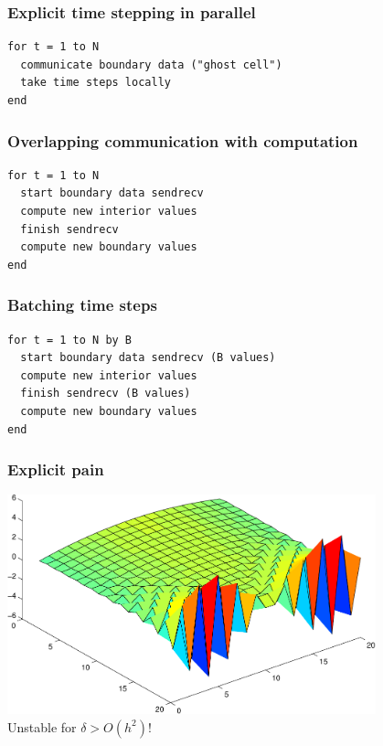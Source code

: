 \documentclass{beamer}
\begin{document}
\begin{frame}[fragile]
  \frametitle{Explicit time stepping in parallel}
  
  \begin{center}
    
  \end{center}
\begin{verbatim}
for t = 1 to N
  communicate boundary data ("ghost cell")
  take time steps locally
end
\end{verbatim}

\end{frame}


\begin{frame}[fragile]
  \frametitle{Overlapping communication with computation}
  
  \begin{center}
    
  \end{center}
\begin{verbatim}
for t = 1 to N
  start boundary data sendrecv
  compute new interior values
  finish sendrecv
  compute new boundary values
end
\end{verbatim}

\end{frame}



\begin{frame}[fragile]
  \frametitle{Batching time steps}

  \begin{center}
    
  \end{center}
\begin{verbatim}
for t = 1 to N by B
  start boundary data sendrecv (B values)
  compute new interior values
  finish sendrecv (B values)
  compute new boundary values
end
\end{verbatim}

\end{frame}


\begin{frame}
  \frametitle{Explicit pain}

  \begin{center}
    \includegraphics[width=0.8\textwidth]{figs/explicit-unstable-demo.pdf} \\
    
    \vspace{5mm}
    Unstable for $\delta > O(h^2)$!
  \end{center}
  
\end{frame}
\end{document}
